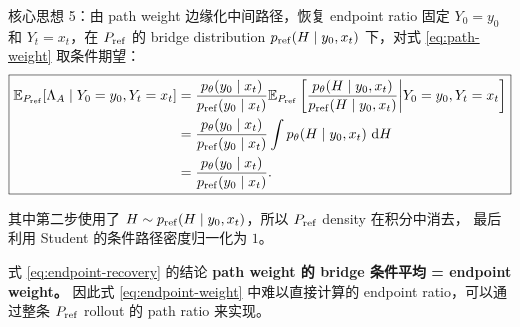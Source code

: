\documentclass[10pt,aspectratio=169]{beamer}
\newcommand{\E}{\mathbb E}
\newcommand{\dd}{\,\mathrm d}
\begin{document}
\begin{frame}{核心思想 5：由 path weight 边缘化中间路径，恢复 endpoint ratio}
\small
固定 $Y_0=y_0$ 和 $Y_t=x_t$，在 $P_{\rm ref}$ 的 bridge distribution
$p_{\rm ref}(H\mid y_0,x_t)$ 下，对式 \eqref{eq:path-weight} 取条件期望：
\begin{equation}
\boxed{
\begin{aligned}
\E_{P_{\rm ref}}[\Lambda_A\mid Y_0=y_0,Y_t=x_t]
&=
\frac{p_\theta(y_0\mid x_t)}
     {p_{\rm ref}(y_0\mid x_t)}
\E_{P_{\rm ref}}
\left[
\frac{p_\theta(H\mid y_0,x_t)}
     {p_{\rm ref}(H\mid y_0,x_t)}
\middle|Y_0=y_0,Y_t=x_t
\right] \\
&=
\frac{p_\theta(y_0\mid x_t)}
     {p_{\rm ref}(y_0\mid x_t)}
\int
p_\theta(H\mid y_0,x_t)\,\dd H \\
&=
\frac{p_\theta(y_0\mid x_t)}
     {p_{\rm ref}(y_0\mid x_t)} .
\end{aligned}
}
\label{eq:endpoint-recovery}
\end{equation}

其中第二步使用了
$H\sim p_{\rm ref}(H\mid y_0,x_t)$，所以 $P_{\rm ref}$ density 在积分中消去，
最后利用 Student 的条件路径密度归一化为 $1$。

\begin{block}{式 \eqref{eq:endpoint-recovery} 的结论}
\textbf{path weight 的 bridge 条件平均 = endpoint weight。}
因此式 \eqref{eq:endpoint-weight} 中难以直接计算的 endpoint ratio，可以通过整条
$P_{\rm ref}$ rollout 的 path ratio 来实现。
\end{block}
\end{frame}
\end{document}
